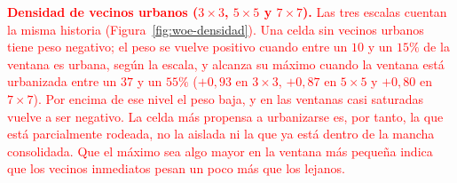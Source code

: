 \textcolor{red}{\textbf{Densidad de vecinos urbanos ($3\times3$, $5\times5$ y
$7\times7$).} Las tres escalas cuentan la misma historia (Figura~\ref{fig:woe-densidad}). Una celda sin vecinos
urbanos tiene peso negativo; el peso se vuelve positivo cuando entre un $10$ y
un $15\%$ de la ventana es urbana, según la escala, y alcanza su máximo cuando la
ventana está urbanizada entre un $37$ y un $55\%$ ($+0{,}93$ en $3\times3$,
$+0{,}87$ en $5\times5$ y $+0{,}80$ en $7\times7$). Por encima de ese nivel el
peso baja, y en las ventanas casi saturadas vuelve a ser negativo. La celda
más propensa a urbanizarse es, por tanto, la que está parcialmente rodeada,
no la aislada ni la que ya está dentro de la mancha consolidada. Que el máximo
sea algo mayor en la ventana más pequeña indica que los vecinos inmediatos
pesan un poco más que los lejanos.}

